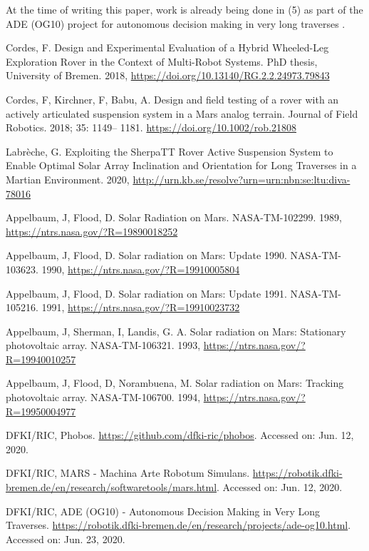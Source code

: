 \documentclass[twocolumn,letterpaper]{IEEEAerospaceCLS}  %
\begin{document}
At the time of writing this paper, work is already being done in (5) as part of the ADE (OG10) project for autonomous decision making in very long traverses 
\cite{ADEOG10}.



%
\begin{thebibliography}{1}

Cordes, F. Design and Experimental Evaluation of a Hybrid Wheeled-Leg Exploration Rover in the Context of Multi-Robot Systems. PhD thesis, University of Bremen. 2018, \url{https://doi.org/10.13140/RG.2.2.24973.79843}

Cordes, F, Kirchner, F, Babu, A. Design and field testing of a rover with an actively articulated suspension system in a Mars analog terrain. Journal of Field Robotics. 2018; 35: 1149– 1181. \url{https://doi.org/10.1002/rob.21808}

Labrèche, G. Exploiting the SherpaTT Rover Active Suspension System to Enable Optimal Solar Array Inclination and Orientation for Long Traverses in a Martian Environment. 2020, \url{http://urn.kb.se/resolve?urn=urn:nbn:se:ltu:diva-78016}

Appelbaum, J, Flood, D. Solar Radiation on Mars. NASA-TM-102299. 1989, \url{https://ntrs.nasa.gov/?R=19890018252}

Appelbaum, J, Flood, D. Solar radiation on Mars: Update 1990. NASA-TM-103623. 1990, \url{https://ntrs.nasa.gov/?R=19910005804}

Appelbaum, J, Flood, D. Solar radiation on Mars: Update 1991. NASA-TM-105216. 1991, \url{https://ntrs.nasa.gov/?R=19910023732}

Appelbaum, J, Sherman, I, Landis, G. A. Solar radiation on Mars: Stationary photovoltaic array. NASA-TM-106321. 1993, \url{https://ntrs.nasa.gov/?R=19940010257}

Appelbaum, J, Flood, D, Norambuena, M. Solar radiation on Mars: Tracking photovoltaic array. NASA-TM-106700. 1994, \url{https://ntrs.nasa.gov/?R=19950004977}

DFKI/RIC, Phobos. \url{https://github.com/dfki-ric/phobos}. Accessed on: Jun. 12, 2020.

DFKI/RIC, MARS - Machina Arte Robotum Simulans. \url{https://robotik.dfki-bremen.de/en/research/softwaretools/mars.html}. Accessed on: Jun. 12, 2020.

DFKI/RIC, ADE (OG10) - Autonomous Decision Making in Very Long Traverses. \url{https://robotik.dfki-bremen.de/en/research/projects/ade-og10.html}. Accessed on: Jun. 23, 2020.

\end{thebibliography}
\end{document}
